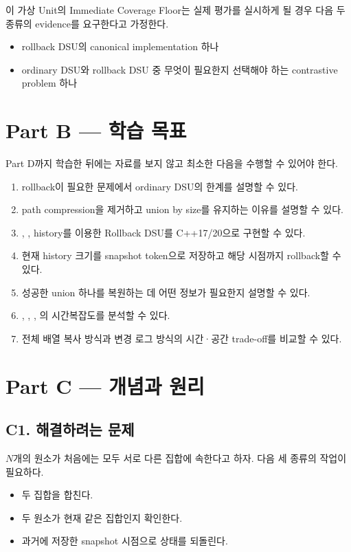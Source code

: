 이 가상 Unit의 Immediate Coverage Floor는 실제 평가를 실시하게 될 경우 다음 두 종류의 evidence를 요구한다고 가정한다.
\begin{itemize}
\item rollback DSU의 canonical implementation 하나
\item ordinary DSU와 rollback DSU 중 무엇이 필요한지 선택해야 하는 contrastive problem 하나
\end{itemize}

\section{Part B --- 학습 목표}

Part D까지 학습한 뒤에는 자료를 보지 않고 최소한 다음을 수행할 수 있어야 한다.
\begin{enumerate}
\item rollback이 필요한 문제에서 ordinary DSU의 한계를 설명할 수 있다.
\item path compression을 제거하고 union by size를 유지하는 이유를 설명할 수 있다.
\item {}, , history를 이용한 Rollback DSU를 C++17/20으로 구현할 수 있다.
\item 현재 history 크기를 snapshot token으로 저장하고 해당 시점까지 rollback할 수 있다.
\item 성공한 union 하나를 복원하는 데 어떤 정보가 필요한지 설명할 수 있다.
\item {}, , , 의 시간복잡도를 분석할 수 있다.
\item 전체 배열 복사 방식과 변경 로그 방식의 시간·공간 trade-off를 비교할 수 있다.
\end{enumerate}

\section{Part C --- 개념과 원리}

\subsection{C1. 해결하려는 문제}
$N$개의 원소가 처음에는 모두 서로 다른 집합에 속한다고 하자. 다음 세 종류의 작업이 필요하다.
\begin{itemize}
\item 두 집합을 합친다.
\item 두 원소가 현재 같은 집합인지 확인한다.
\item 과거에 저장한 snapshot 시점으로 상태를 되돌린다.
\end{itemize}

